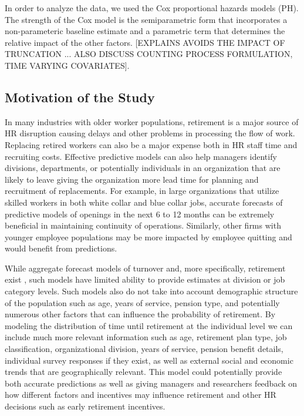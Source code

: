\documentclass[12pt,letterpaper]{article}
\begin{document}
In order to analyze the data, we used the Cox proportional hazards models (PH).  The strength of the Cox model is the semiparametric form that incorporates a non-parameteric baseline estimate and a parametric term that determines the relative impact of the other factors. [EXPLAINS AVOIDS THE IMPACT OF TRUNCATION ... ALSO DISCUSS COUNTING PROCESS FORMULATION, TIME VARYING COVARIATES].

\subsection{Motivation of the Study}


In many industries with older worker populations, retirement is a major source of HR disruption causing delays and other problems in processing the flow of work.  Replacing retired workers can also be a major expense both in HR staff time and recruiting costs.  Effective predictive models can also help managers identify divisions, departments, or potentially individuals in an organization that are likely to leave giving the organization more lead time for planning and recruitment of replacements.  For example, in large organizations that utilize skilled workers in both white collar and blue collar jobs, accurate forecasts of predictive models of openings in the next 6 to 12 months can be extremely beneficial in maintaining continuity of operations.  Similarly, other firms with younger employee populations may be more impacted by employee quitting and would benefit from predictions.

While aggregate forecast models of turnover and, more specifically, retirement exist \citep{zhu2015}, such models have limited ability to provide estimates at division or job category levels.  Such models also do not take into account demographic structure of the population such as age, years of service, pension type, and potentially numerous other factors that can influence the probability of retirement.  By modeling the distribution of time until retirement at the individual level we can include much more relevant information such as age, retirement plan type, job classification, organizational division, years of service, pension benefit details, individual survey responses if they exist, as well as external social and economic trends that are geographically relevant.   This model could potentially provide both accurate predictions as well as giving managers and researchers feedback on how different factors and incentives may influence retirement and other HR decisions such as early retirement incentives.
\end{document}
